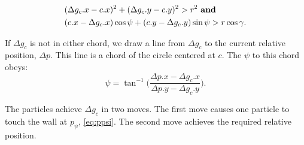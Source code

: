 \begin{align}\label{eq:ifinchord}
&(\Delta g_c.x - c.x)^2 + (\Delta g_c.y - c.y)^2  > r^2 \textrm{     \textbf{and}}\\ \nonumber
 &( c.x-\Delta g_c.x ) \cos\psi + ( c.y-\Delta g_c.y) \sin\psi > r\cos\gamma.
\end{align}

 If $\Delta g_c$ is not in either chord, we draw a line from $\Delta g_c$ to the current relative position, $\Delta p$. This line is a chord of the circle centered at $c$. The $\psi$ to this chord obeys:
  \begin{equation}
 \psi = \tan^{-1}\Big(\frac{\Delta p.x - \Delta g_c.x}{\Delta p.y - \Delta g_c.y} \Big).
 \end{equation}
 
The particles achieve $\Delta g_c$ in two moves. The first move causes one particle to touch the wall at $p_\psi$, \eqref{eq:ppsi}. The second move achieves the required relative position.
 

 
% 
 

   

